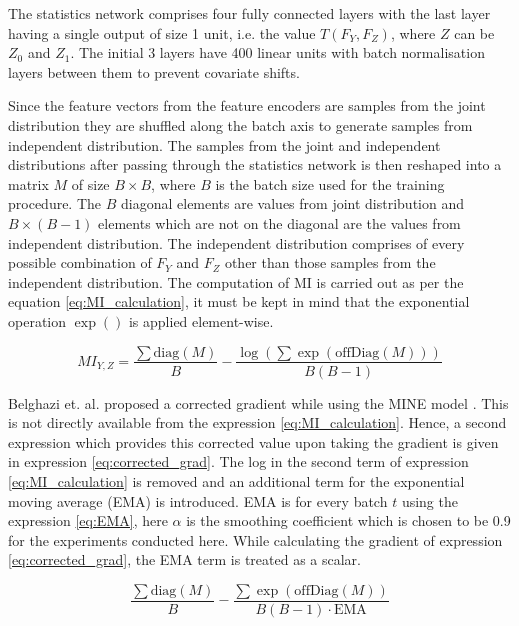 \documentclass[12pt,DIV14,BCOR12mm,a4paper,footinclude=false,headinclude,parskip=half-,twoside,openright,cleardoublepage=empty,toc=index,bibliography=totoc,listof=totoc]{scrreprt}
\numberwithin{equation}{chapter}
\begin{document}
The statistics network comprises four fully connected layers with the last layer having a single output of size 1 unit, i.e. the value $T(F_Y,F_Z)$, where $Z$ can be $Z_0$ and $Z_1$. The initial 3 layers have 400 linear units with batch normalisation layers between them to prevent covariate shifts. 

Since the feature vectors from the feature encoders are samples from the joint distribution they are shuffled along the batch axis to generate samples from independent distribution. The samples from the joint and independent distributions after passing through the statistics network is then reshaped into a matrix $M$ of size $B\times B$, where $B$ is the batch size used for the training procedure. The $B$ diagonal elements are values from joint distribution and $B \times (B-1)$ elements which are not on the diagonal are the values from independent distribution. The independent distribution comprises of every possible combination of $F_Y$ and $F_Z$ other than those samples from the independent distribution. The computation of MI is carried out as per the equation \ref{eq:MI_calculation}, it must be kept in mind that the exponential operation $\exp()$ is applied element-wise.

\begin{equation}\label{eq:MI_calculation}
    MI_{Y,Z} = \frac{\sum \text{diag}(M)}{B} - \frac{\log \left(\sum \exp\left(\text{offDiag}(M)\right) \right)}{B(B-1)}
\end{equation}

Belghazi et. al. proposed a corrected gradient while using the MINE model \cite{DBLP:journals/corr/abs-1801-04062}. This is not directly available from the expression \ref{eq:MI_calculation}. Hence, a second expression which provides this corrected value upon taking the gradient is given in expression \ref{eq:corrected_grad}. The log in the second term of expression \ref{eq:MI_calculation} is removed and an additional term for the exponential moving average (EMA) is introduced. EMA is for every batch $t$ using the expression \ref{eq:EMA}, here $\alpha$ is the smoothing coefficient which is chosen to be 0.9 for the experiments conducted here. While calculating the gradient of expression \ref{eq:corrected_grad}, the EMA term is treated as a scalar. 

\begin{equation}\label{eq:corrected_grad}
    \frac{\sum \text{diag}(M)}{B} - \frac{\sum \exp\left(\text{offDiag}(M)\right)}{B(B-1) \cdot \text{EMA}}
\end{equation}
\end{document}
